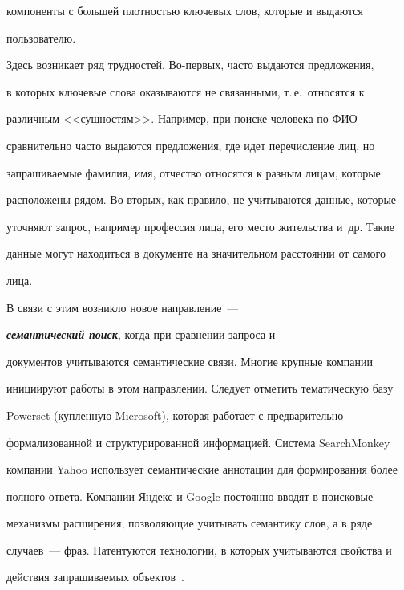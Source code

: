 компоненты с большей плотностью ключевых слов, которые и выдаются 


пользователю. 


    


    Здесь возникает ряд трудностей. Во-первых, часто выдаются предложения, 


в которых ключевые слова оказываются не связанными, т.\,е.\ относятся к 


различным <<сущностям>>. Например, при поиске человека по ФИО 


сравнительно часто выдаются предложения, где идет перечисление лиц, но 


запрашиваемые фамилия, имя, отчество относятся к разным лицам, которые 


расположены рядом. Во-вторых, как правило, не учитываются данные, которые 


уточняют запрос, например профессия лица, его место жительства и~др. Такие 


данные могут находиться в документе на значительном расстоянии от самого 


лица.


    


    В связи с этим возникло новое направление~--- 


{\bfseries\textit{семантический поиск}}, когда при сравнении запроса и 


документов учитываются семантические связи. Многие крупные компании 


инициируют работы в этом направлении. Следует отметить тематическую базу 


Powerset (купленную Microsoft), которая работает с предварительно 


формализованной и структурированной информацией. Система SearchMonkey 


компании Yahoo использует семантические аннотации для формирования более 


полного ответа. Компании Яндекс и Google постоянно вводят в поисковые 


механизмы расширения, позволяющие учитывать семантику слов, а в ряде 


случаев~--- фраз. Патентуются технологии, в которых учитываются свойства и 


действия запрашиваемых объектов~\cite{10-kuz, 11-kuz}. 


    


